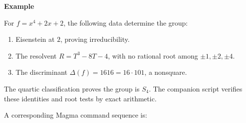 \documentclass[11pt,a4paper,oneside,openany]{book}
\begin{document}
\begin{atlasblock}[standard]
\textbf{\sffamily Example}\par\smallskip
\color{black} For \(f=x^4+2x+2\), the following data determine the group:\par

\begin{enumerate}
\item\leavevmode\color{black} Eisenstein at \(2\), proving irreducibility.
\item\leavevmode\color{black} The resolvent \(R=T^3-8T-4\), with no rational root among \(\pm1,\pm2,\pm4\).
\item\leavevmode\color{black} The discriminant \(\Delta(f)=1616=16\cdot101\), a nonsquare.
\end{enumerate}
\color{black} The quartic classification proves the group is \(S_4\). The companion script verifies these identities and root tests by exact arithmetic.\par
\end{atlasblock}\color{black}
\color{black} A corresponding Magma command sequence is:\par
\end{document}
